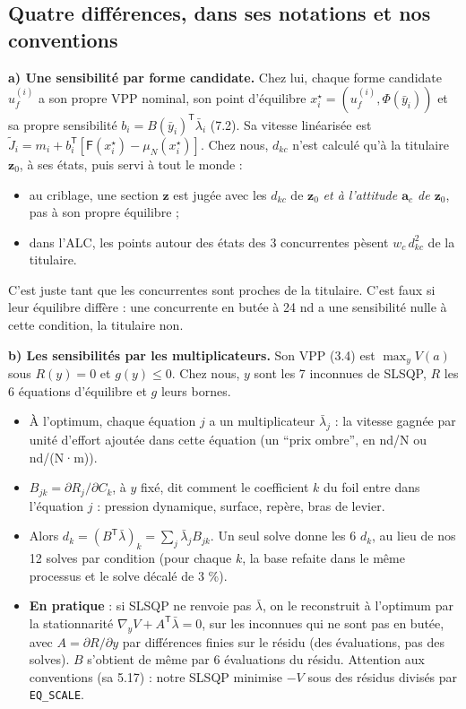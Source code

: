 \documentclass[11pt,a4paper]{article}
\newcommand{\vz}{\bm{z}}
\newcommand{\va}{\bm{a}}
\newcommand{\py}[1]{\texttt{#1}}
\newcommand{\F}{\mathsf{F}}
\newcommand{\tp}{^{\mathsf{T}}}
\begin{document}
\subsection*{Quatre différences, dans ses notations et nos conventions}

\textbf{a) Une sensibilité par forme candidate.} Chez lui, chaque forme candidate $u_f^{(i)}$ a son propre VPP
nominal, son point d'équilibre $x^\star_i=(u_f^{(i)},\Phi(\bar y_i))$ et sa propre sensibilité
$b_i=B(\bar y_i)\tp\bar\lambda_i$ (7.2). Sa vitesse linéarisée est $\tilde J_i=m_i+b_i\tp[\F(x^\star_i)-\mu_N(x^\star_i)]$.
Chez nous, $d_{kc}$ n'est calculé qu'à la titulaire $\vz_0$, à ses états, puis servi à tout le monde :
\begin{itemize}
  \item au criblage, une section $\vz$ est jugée avec les $d_{kc}$ de $\vz_0$ \emph{et à l'attitude $\va_c$ de
        $\vz_0$}, pas à son propre équilibre ;
  \item dans l'ALC, les points autour des états des 3 concurrentes pèsent $w_c\,d_{kc}^2$ de la titulaire.
\end{itemize}
C'est juste tant que les concurrentes sont proches de la titulaire. C'est faux si leur équilibre diffère : une
concurrente en butée à 24 nd a une sensibilité nulle à cette condition, la titulaire non.

\textbf{b) Les sensibilités par les multiplicateurs.} Son VPP (3.4) est $\max_y V(a)$ sous $R(y)=0$ et
$g(y)\le0$. Chez nous, $y$ sont les 7 inconnues de SLSQP, $R$ les 6 équations d'équilibre et $g$ leurs bornes.
\begin{itemize}
  \item À l'optimum, chaque équation $j$ a un multiplicateur $\bar\lambda_j$ : la vitesse gagnée par unité
        d'effort ajoutée dans cette équation (un \enquote{prix ombre}, en nd/N ou nd/(N·m)).
  \item $B_{jk}=\partial R_j/\partial C_k$, à $y$ fixé, dit comment le coefficient $k$ du foil entre dans
        l'équation $j$ : pression dynamique, surface, repère, bras de levier.
  \item Alors $d_k=(B\tp\bar\lambda)_k=\sum_j\bar\lambda_j B_{jk}$. Un seul solve donne les 6 $d_k$, au lieu de
        nos 12 solves par condition (pour chaque $k$, la base refaite dans le même processus et le solve
        décalé de 3 \%).
  \item \textbf{En pratique} : si SLSQP ne renvoie pas $\bar\lambda$, on le reconstruit à l'optimum par la
        stationnarité $\nabla_yV+A\tp\bar\lambda=0$, sur les inconnues qui ne sont pas en butée, avec
        $A=\partial R/\partial y$ par différences finies sur le résidu (des évaluations, pas des solves). $B$
        s'obtient de même par 6 évaluations du résidu. Attention aux conventions (sa 5.17) : notre SLSQP minimise
        $-V$ sous des résidus divisés par \py{EQ\_SCALE}.
\end{itemize}
\end{document}

